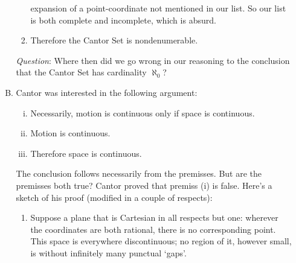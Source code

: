 \documentclass[twoside,openright]{article}
\begin{document}
\begin{enumerate}
\begin{enumerate}[A.]
\begin{enumerate}[(1)]
        expansion of a point-coordinate not mentioned in our list. So
        our list is both complete and incomplete, which is absurd.
      \item Therefore the Cantor Set is nondenumerable.
      \end{enumerate}
      \emph{Question}: Where then did we go wrong in our reasoning to
      the conclusion that the Cantor Set has cardinality $\aleph_0$?
    \item Cantor was interested in the following argument:
      \begin{enumerate}[(i)]
      \item Necessarily, motion is continuous only if space is
        continuous.
      \item Motion is continuous.
      \item Therefore space is continuous.
      \end{enumerate}
      The conclusion follows necessarily from the premisses. But are
      the premisses both true? Cantor proved that premiss (i) is
      false. Here's a sketch of his proof (modified in a couple of
      respects):
      \begin{enumerate}[(1)]
      \item Suppose a plane that is Cartesian in all respects but one:
        wherever the coordinates are both rational, there is no
        corresponding point. This space is everywhere discontinuous;
        no region of it, however small, is without infinitely many
        punctual `gaps'.


\end{enumerate}
\end{enumerate}
\end{enumerate}
\end{document}
